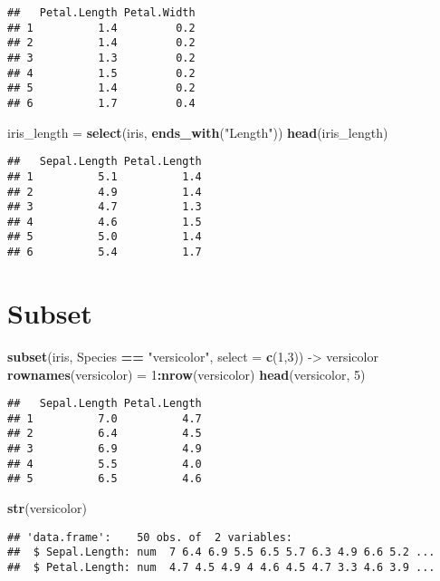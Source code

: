 \documentclass[
]{article}
\newenvironment{Shaded}{\begin{snugshade}}{\end{snugshade}}
\newcommand{\DataTypeTok}[1]{\textcolor[rgb]{0.13,0.29,0.53}{#1}}
\newcommand{\DecValTok}[1]{\textcolor[rgb]{0.00,0.00,0.81}{#1}}
\newcommand{\KeywordTok}[1]{\textcolor[rgb]{0.13,0.29,0.53}{\textbf{#1}}}
\newcommand{\NormalTok}[1]{#1}
\newcommand{\OperatorTok}[1]{\textcolor[rgb]{0.81,0.36,0.00}{\textbf{#1}}}
\newcommand{\StringTok}[1]{\textcolor[rgb]{0.31,0.60,0.02}{#1}}
\begin{document}
\begin{verbatim}
##   Petal.Length Petal.Width
## 1          1.4         0.2
## 2          1.4         0.2
## 3          1.3         0.2
## 4          1.5         0.2
## 5          1.4         0.2
## 6          1.7         0.4
\end{verbatim}

\begin{Shaded}
\begin{Highlighting}[]
\NormalTok{iris_length =}\StringTok{ }\KeywordTok{select}\NormalTok{(iris, }\KeywordTok{ends_with}\NormalTok{(}\StringTok{"Length"}\NormalTok{))}
\KeywordTok{head}\NormalTok{(iris_length)}
\end{Highlighting}
\end{Shaded}

\begin{verbatim}
##   Sepal.Length Petal.Length
## 1          5.1          1.4
## 2          4.9          1.4
## 3          4.7          1.3
## 4          4.6          1.5
## 5          5.0          1.4
## 6          5.4          1.7
\end{verbatim}

\hypertarget{subset}{%
\section{Subset}\label{subset}}

\begin{Shaded}
\begin{Highlighting}[]
\KeywordTok{subset}\NormalTok{(iris, Species }\OperatorTok{==}\StringTok{ "versicolor"}\NormalTok{, }\DataTypeTok{select =} \KeywordTok{c}\NormalTok{(}\DecValTok{1}\NormalTok{,}\DecValTok{3}\NormalTok{)) ->}\StringTok{ }\NormalTok{versicolor}
\KeywordTok{rownames}\NormalTok{(versicolor) =}\StringTok{ }\DecValTok{1}\OperatorTok{:}\KeywordTok{nrow}\NormalTok{(versicolor)}
\KeywordTok{head}\NormalTok{(versicolor, }\DecValTok{5}\NormalTok{)}
\end{Highlighting}
\end{Shaded}

\begin{verbatim}
##   Sepal.Length Petal.Length
## 1          7.0          4.7
## 2          6.4          4.5
## 3          6.9          4.9
## 4          5.5          4.0
## 5          6.5          4.6
\end{verbatim}

\begin{Shaded}
\begin{Highlighting}[]
\KeywordTok{str}\NormalTok{(versicolor)}
\end{Highlighting}
\end{Shaded}

\begin{verbatim}
## 'data.frame':    50 obs. of  2 variables:
##  $ Sepal.Length: num  7 6.4 6.9 5.5 6.5 5.7 6.3 4.9 6.6 5.2 ...
##  $ Petal.Length: num  4.7 4.5 4.9 4 4.6 4.5 4.7 3.3 4.6 3.9 ...
\end{verbatim}
\end{document}
